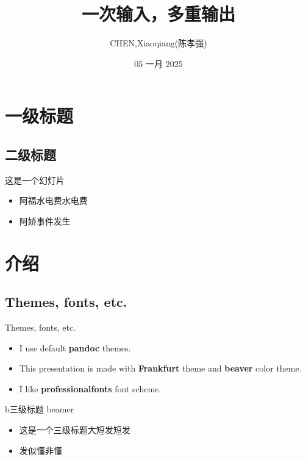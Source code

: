 \documentclass[
  11pt,
  aspectratio=169]{beamer}
\title{一次输入，多重输出}
\author{CHEN,Xiaoqiang(陈孝强)}
\date{05 一月 2025}
\providecommand{\tightlist}{%
  \setlength{\itemsep}{0pt}\setlength{\parskip}{0pt}}
\begin{document}
\maketitle

{
\hypersetup{linkcolor=}
\setcounter{tocdepth}{3}
\tableofcontents
}
\section{一级标题}\label{ux4e00ux7ea7ux6807ux9898}

\subsection{二级标题}\label{ux4e8cux7ea7ux6807ux9898}

\begin{frame}{这是一个幻灯片}
\label{ux8fd9ux662fux4e00ux4e2aux5e7bux706fux7247}
\begin{itemize}
\tightlist
\item
  阿福水电费水电费
\item
  阿娇事件发生
\end{itemize}
\end{frame}

\section{介绍}\label{ux4ecbux7ecd}

\subsection{Themes, fonts, etc.}\label{themes-fonts-etc.}

\begin{frame}{Themes, fonts, etc.}
\begin{itemize}
\tightlist
\item
  I use default \textbf{pandoc} themes.
\item
  This presentation is made with \textbf{Frankfurt} theme and
  \textbf{beaver} color theme.
\item
  I like \textbf{professionalfonts} font scheme.
\end{itemize}
\end{frame}

\begin{frame}{b三级标题 beamer}
\label{bux4e09ux7ea7ux6807ux9898-beamer}
\begin{itemize}
\tightlist
\item
  这是一个三级标题大短发短发
\item
  发似懂非懂
\end{itemize}
\end{frame}
\end{document}

